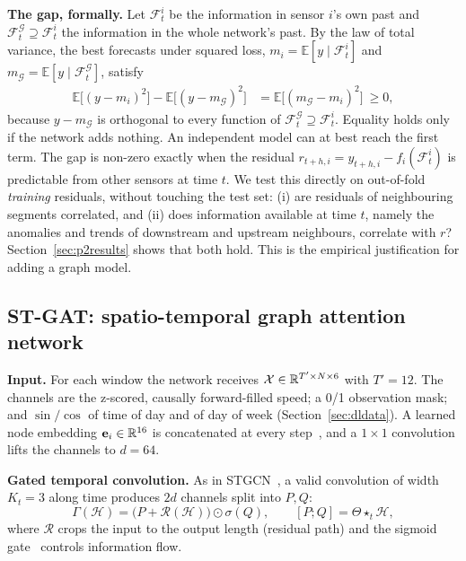 \textbf{The gap, formally.} Let $\mathcal{F}^{i}_t$ be the information in sensor
$i$'s own past and $\mathcal{F}^{\mathcal{G}}_t\supseteq\mathcal{F}^{i}_t$ the
information in the whole network's past. By the law of total variance, the best
forecasts under squared loss, $m_i=\mathbb{E}[y\mid\mathcal{F}^{i}_t]$ and
$m_{\mathcal{G}}=\mathbb{E}[y\mid\mathcal{F}^{\mathcal{G}}_t]$, satisfy
\begin{equation}
\begin{split}
\mathbb{E}\big[(y-m_i)^2\big]-\mathbb{E}\big[(y-m_{\mathcal{G}})^2\big]
&=\mathbb{E}\big[(m_{\mathcal{G}}-m_i)^2\big]\ \ge 0,
\end{split}
\label{eq:gap}
\end{equation}
because $y-m_{\mathcal{G}}$ is orthogonal to every function of
$\mathcal{F}^{\mathcal{G}}_t\supseteq\mathcal{F}^{i}_t$. Equality holds only if the
network adds nothing. An independent model can at best reach the first term. The gap
is non-zero exactly when the residual
$r_{t+h,i}=y_{t+h,i}-f_i(\mathcal{F}^{i}_t)$ is predictable from other sensors at
time $t$. We test this directly on out-of-fold \emph{training} residuals, without
touching the test set: (i) are residuals of neighbouring segments correlated, and
(ii) does information available at time $t$, namely the anomalies and trends of
downstream and upstream neighbours, correlate with $r$? Section~\ref{sec:p2results}
shows that both hold. This is the empirical justification for adding a graph model.

\subsection{ST-GAT: spatio-temporal graph attention network}
\label{sec:stgat}
\textbf{Input.} For each window the network receives
$\mathcal{X}\in\mathbb{R}^{T'\times N\times 6}$ with $T'{=}12$. The channels are the
z-scored, causally forward-filled speed; a 0/1 observation mask; and $\sin/\cos$
of time of day and of day of week (Section~\ref{sec:dldata}). A learned node
embedding $\mathbf{e}_i\in\mathbb{R}^{16}$ is concatenated at every step~\cite{shao2022stid},
and a $1{\times}1$ convolution lifts the channels to $d{=}64$.

\textbf{Gated temporal convolution.} As in STGCN~\cite{yu2018stgcn}, a valid
convolution of width $K_t{=}3$ along time produces $2d$ channels split into $P,Q$:
\begin{equation}
\Gamma(\mathcal{H})=\big(P+\mathcal{R}(\mathcal{H})\big)\odot\sigma(Q),\qquad [P;Q]=\Theta\star_t\mathcal{H},
\label{eq:glu}
\end{equation}
where $\mathcal{R}$ crops the input to the output length (residual path) and the
sigmoid gate~\cite{dauphin2017glu} controls information flow.


